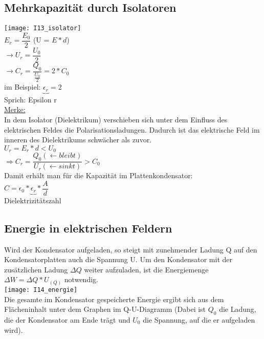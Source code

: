 \documentclass[12pt]{scrartcl}
\begin{document}
\begin{flushleft}
		\subsection{Mehrkapazität durch Isolatoren}
		\texttt{[image: I13\_isolator]} \\
		\vspace{2mm}
		$ E_{r} = \dfrac{E_{0}}{2} $ \hspace{20mm} (U = $ E \ast d $) 
		\vspace{4mm} \\
		$ \rightarrow U_{r} = \dfrac{U_{0}}{2} $
		\vspace{4mm} \\
		$ \rightarrow C_{r} = \dfrac{Q_{0}}{\frac{U_{0}}{2}} = 2 \ast C_{0} $
		\vspace{6mm} \\
		im Beispiel: $ \underbrace{\epsilon_{r}} = 2 $ \\
		\hspace{12mm} Sprich: Epsilon r
		\vspace{5mm} \\
		\underline{Merke:} \\
		In dem Isolator (Dielektrikum) verschieben sich unter dem Einfluss des elektrischen Feldes die Polarisationsladungen. Dadurch ist das elektrische Feld im inneren des Dielektrikums schwächer als zuvor. 
		\vspace{5mm} \\
		$ U_{r} = E_{r} \ast d < U_{0} $
		\vspace{5mm} \\
		$ \Rightarrow C_{r} = \dfrac{Q_{0} (\leftarrow bleibt)}{U_{r} (\leftarrow sinkt)} > C_{0} $
		\vspace{3mm} \\
		Damit erhält man für die Kapazität im Plattenkondensator: 
		\vspace{2mm} \\
		$ C = \epsilon_{0} \ast \underbrace{\epsilon_{r}} \ast \dfrac{A}{d} $ \\
		\vspace{1mm}
		\hspace{4mm} Dielektrizitätszahl
		
		\subsection{Energie in elektrischen Feldern}
		Wird der Kondensator aufgeladen, so steigt mit zunehmender Ladung Q auf den Kondensatorplatten auch die Spannung U. Um den Kondensator mit der zusätzlichen Ladung $\Delta Q$ weiter aufzuladen, ist die Energiemenge $\Delta W = \Delta Q \ast U_{(Q)} $ notwendig.
		\vspace{2mm} \\
		\texttt{[image: I14\_energie]}
		\vspace{2mm} \\
		Die gesamte im Kondensator gespeicherte Energie ergibt sich aus dem Flächeninhalt unter dem Graphen im Q-U-Diagramm (Dabei ist $Q_{0}$ die Ladung, die der Kondensator am Ende trägt und $U_{0}$ die Spannung, auf die er aufgeladen wird).
		

\end{flushleft}
\end{document}

